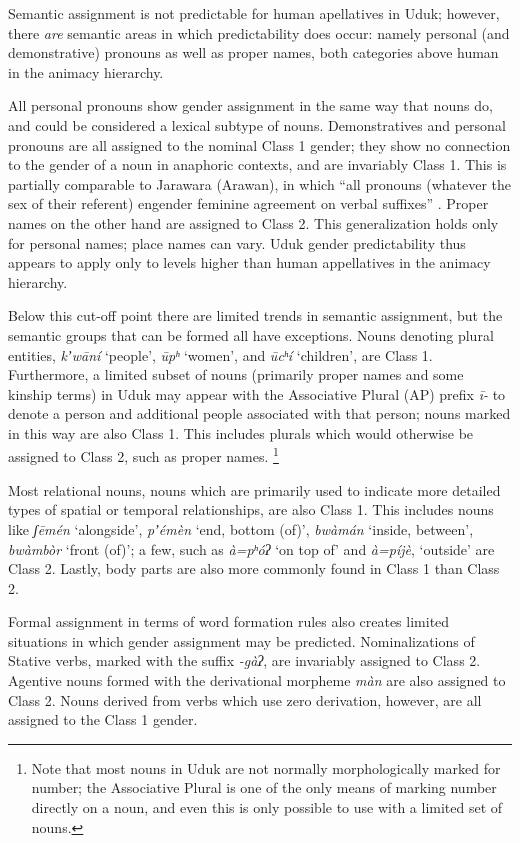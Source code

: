 \documentclass[output=collectionpaper,hidelinks]{langscibook}
\theoremstyle{remark}
\begin{document}
Semantic assignment is not predictable for human apellatives in Uduk; however,
there \emph{are} semantic areas in which predictability does occur: namely
personal (and demonstrative) pronouns as well as proper names, both categories
above human in the animacy hierarchy.

All personal pronouns show gender assignment in the same way that nouns do, and
could be considered a lexical subtype of nouns.  Demonstratives and personal
pronouns are all assigned to the nominal Class 1 gender; they show no connection
to the gender of a noun in anaphoric contexts, and are invariably Class 1.  This
is partially comparable to Jarawara (Arawan), in which ``all pronouns (whatever
the sex of their referent) engender feminine agreement on verbal suffixes''
\citep[488]{Dixon2000}.  Proper names on the other hand are assigned
to Class 2.  This generalization holds only for personal names; place names can
vary.  Uduk gender predictability thus appears to apply only to levels higher
than human appellatives in the animacy hierarchy.

Below this cut-off point there are limited trends in semantic assignment, but
the semantic groups that can be formed all have exceptions.  Nouns denoting
plural entities, \emph{kʼwāní} `people', \emph{ūpʰ} `women', and
\emph{ūcʰí} `children', are Class 1.  Furthermore, a limited subset of nouns
(primarily proper names and some kinship terms) in Uduk may appear with the
Associative Plural (AP) prefix \emph{ī-} to denote a person and additional
people associated with that person; nouns marked in this way are also Class 1.
This includes plurals which would otherwise be assigned to Class 2, such as
proper names.%
\footnote{Note that most nouns in Uduk are not normally morphologically
marked for number; the Associative Plural is one of the only means of marking
number directly on a noun, and even this is only possible to use with a limited
set of nouns.}

Most relational nouns, nouns which are primarily used to indicate more detailed
types of spatial or temporal relationships, are also Class 1. This includes
nouns like \emph{ʃēmén} `alongside', \emph{pʼémèn} `end, bottom (of)',
\emph{bwàmán} `inside, between', \emph{bwàmbòr} `front (of)'; a few, such as
\emph{à=pʰóʔ} `on top of' and \emph{à=píjè}, `outside' are Class 2. Lastly,
body parts are also more commonly found in Class 1 than Class 2.

Formal assignment in terms of word formation rules also creates limited
situations in which gender assignment may be predicted. Nominalizations of
Stative verbs, marked with the suffix \emph{-gàʔ}, are invariably assigned to
Class 2. Agentive nouns formed with the derivational morpheme \emph{màn} are
also assigned to Class 2. Nouns derived from verbs which use zero derivation,
however, are all assigned to the Class 1 gender.
\end{document}
